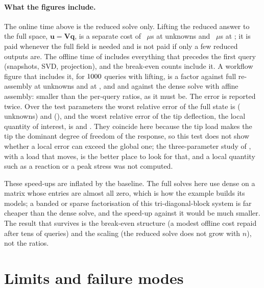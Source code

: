\paragraph{What the figures include.} The online time above is the reduced solve only. Lifting the reduced answer to the full space, $\bm u=\bm V\bm q$, is a separate cost of \cpdRecUs~$\mu$s at \cpdNFree{} unknowns and \cpdRecUsBig~$\mu$s at \cpdBigNf; it is paid whenever the full field is needed and is not paid if only a few reduced outputs are. The offline time of  includes everything that precedes the first query (snapshots, SVD, projection), and the break-even counts include it. A workflow figure that includes it, for $1000$ queries with lifting, is a factor \cpdWorkflow{} against full re-assembly at \cpdNFree{} unknowns and \cpdWorkflowBig{} at \cpdBigNf, and \cpdWorkflowSparseFree{} and \cpdWorkflowSparseFreeBig{} against the dense solve with affine assembly: smaller than the per-query ratios, as it must be. The error is reported twice. Over the test parameters the worst relative error of the full state is \cpdGlobErr{} (\cpdNFree{} unknowns) and \cpdGlobErrBig{} (\cpdBigNf), and the worst relative error of the tip deflection, the local quantity of interest, is \cpdLocErr{} and \cpdLocErrBig. They coincide here because the tip load makes the tip the dominant degree of freedom of the response, so this test does not show whether a local error can exceed the global one; the three-parameter study of , with a load that moves, is the better place to look for that, and a local quantity such as a reaction or a peak stress was not computed.


These speed-ups are inflated by the baseline. The full solves here use dense  on a matrix whose entries are almost all zero, which is how the example builds its models; a banded or sparse factorisation of this tri-diagonal-block system is far cheaper than the dense solve, and the speed-up against it would be much smaller. The result that survives is the break-even structure (a modest offline cost repaid after tens of queries) and the scaling (the reduced solve does not grow with $n$), not the ratios.

\section{Limits and failure modes}\label{sec:pod-limits}

